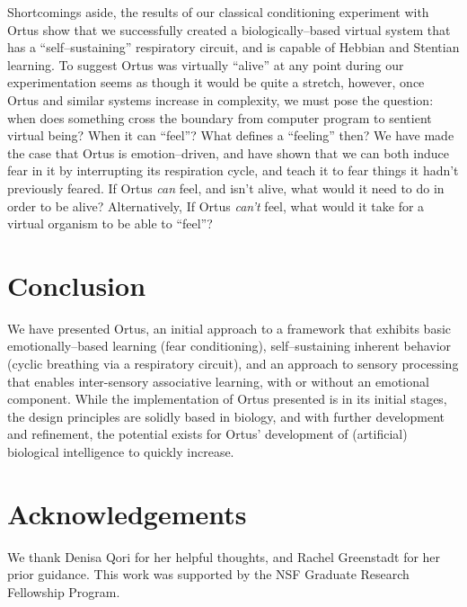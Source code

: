 \documentclass[letterpaper]{article}
\begin{document}
Shortcomings aside, the results of our classical conditioning experiment with Ortus show that we successfully created a biologically--based virtual system that has a ``self--sustaining'' respiratory circuit, and is capable of Hebbian and Stentian learning. To suggest Ortus was virtually ``alive'' at any point during our experimentation seems as though it would be quite a stretch, however, once Ortus and similar systems increase in complexity, we must pose the question: when does something cross the boundary from computer program to sentient virtual being? When it can ``feel''? What defines a ``feeling'' then? We have made the case that Ortus is emotion--driven, and have shown that we can both induce fear in it by interrupting its respiration cycle, and teach it to fear things it hadn't previously feared. If Ortus \textit{can} feel, and isn't alive, what would it need to do in order to be alive? Alternatively, If Ortus \textit{can't} feel, what would it take for a virtual organism to be able to ``feel''?

\section{Conclusion}
We have presented Ortus, an initial approach to a framework that exhibits basic emotionally--based learning (fear conditioning), self--sustaining inherent behavior (cyclic breathing via a respiratory circuit), and an approach to sensory processing that enables inter-sensory associative learning, with or without an emotional component. While the implementation of Ortus presented is in its initial stages, the design principles are solidly based in biology, and with further development and refinement, the potential exists for Ortus' development of (artificial) biological intelligence to quickly increase. %


\section{Acknowledgements}

We thank Denisa Qori for her helpful thoughts, and Rachel Greenstadt for her prior guidance.
This work was supported by the NSF Graduate Research Fellowship Program. 

\footnotesize

\end{document}

